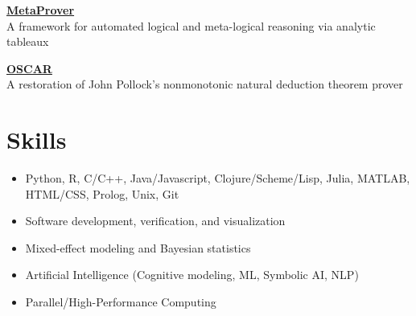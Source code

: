 \documentclass[margin]{res}
\begin{document}
\begin{resume}
  \href{https://github.com/kevingoneill/MetaProver}{\textbf{MetaProver}}
  \\ A framework for automated logical and meta-logical reasoning via
  analytic tableaux

  \href{http://rair.cogsci.rpi.edu/projects/automated-reasoners/oscar/}{\textbf{OSCAR}} \\
  A restoration of John Pollock's nonmonotonic natural deduction theorem prover \\

  \section{Skills}
  \begin{itemize}
  \item Python, R, C/C++, Java/Javascript, Clojure/Scheme/Lisp, Julia, MATLAB, HTML/CSS, Prolog, Unix, Git
  \item Software development, verification, and visualization
  \item Mixed-effect modeling and Bayesian statistics
  \item Artificial Intelligence (Cognitive modeling, ML, Symbolic AI, NLP)
  \item Parallel/High-Performance Computing
  \end{itemize}
\end{resume}
\end{document}
